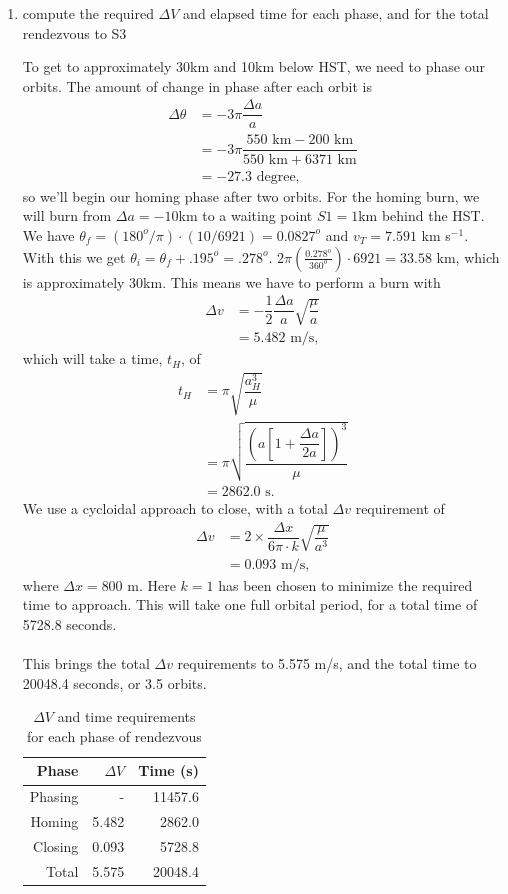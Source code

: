 \documentclass[onecolumn,10pt]{jhwhw}
\begin{document}
\begin{enumerate}
\itemsep0em
\item compute the required $\Delta V$ and elapsed time for each phase, and for the total rendezvous to S3

To get to approximately 30km and 10km below HST, we need to phase our orbits. The amount of change in phase after each orbit is
\begin{align*}
\Delta \theta &= -3 \pi \dfrac{\Delta a}{a} \\
              &= -3 \pi \dfrac{550 \mbox{ km} - 200 \mbox{ km}}{550 \mbox{ km} + 6371 \mbox{ km}} \\
              &= -27.3 \mbox{ degree},
\end{align*}
so we'll begin our homing phase after two orbits. For the homing burn, we will burn from $\Delta a = -10$km to a waiting point $S1 = 1$km behind the HST. We have $\theta_f = (180^o/\pi) \cdot (10/6921) = 0.0827^o$ and $v_T = 7.591$ km s$^{-1}$. With this we get $\theta_i = \theta_f + .195^o = .278^o$. $2 \pi(\frac{0.278^o}{360^o}) \cdot 6921 = 33.58$ km, which is approximately 30km. This means we have to perform a burn with
\begin{align*}
\Delta v &= - \dfrac{1}{2}\dfrac{\Delta a}{a}\sqrt{\dfrac{\mu}{a}} \\
         &= 5.482 \mbox{ m/s},
\end{align*}
which will take a time, $t_H$, of
\begin{align*}
t_H &= \pi \sqrt{\dfrac{a_H^3}{\mu}} \\
    &= \pi \sqrt{\dfrac{\left( a \left[ 1 + \dfrac{\Delta a}{2a} \right] \right)^3}{\mu}} \\
    &= 2862.0 \mbox{ s}.
\end{align*}
We use a cycloidal approach to close, with a total $\Delta v$ requirement of
\begin{align*}
\Delta v &= 2 \times \dfrac{\Delta x}{6 \pi \cdot k} \sqrt{\dfrac{\mu}{a^3}}\\
         &= 0.093 \mbox{ m/s},
\end{align*}
where $\Delta x = 800$ m. Here $k=1$ has been chosen to minimize the required time to approach. This will take one full orbital period, for a total time of 5728.8 seconds. \\
\\
This brings the total $\Delta v$ requirements to 5.575 m/s, and the total time to 20048.4 seconds, or 3.5 orbits.
\begin{table}[h]
\begin{center}
\begin{tabular}{rrr}
\toprule
Phase    & $\Delta V$ & Time (s) \\
\midrule
Phasing & - & 11457.6 \\
Homing & 5.482 & 2862.0 \\
Closing & 0.093 & 5728.8 \\
\midrule
Total & 5.575 & 20048.4\\
\bottomrule
\end{tabular}
\end{center}
\caption{$\Delta V$ and time requirements for each phase of rendezvous}
\end{table}


\end{enumerate}
\end{document}
